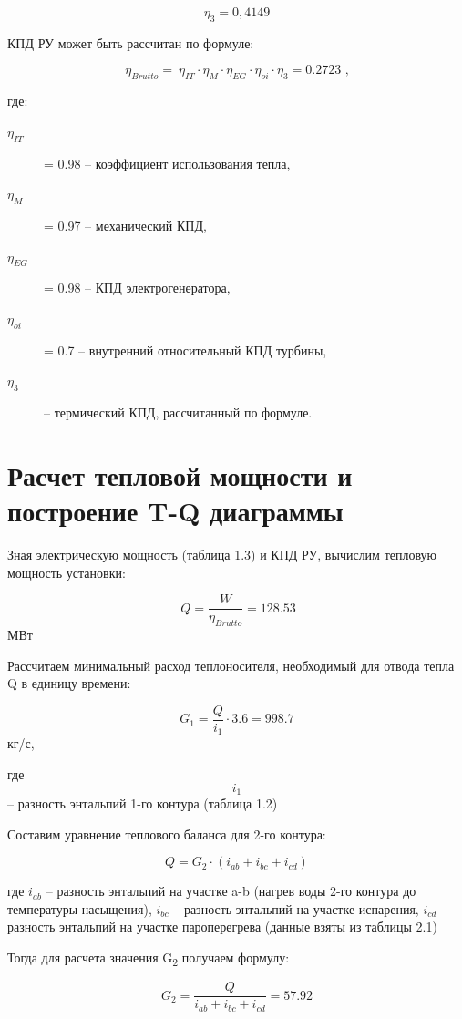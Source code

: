 \[\eta_{3} = 0,4149\]

КПД РУ может быть рассчитан по формуле:

\[\eta_{Brutto} = \ \eta_{IT} \cdot \eta_{M} \cdot \eta_{EG} \cdot \eta_{oi} \cdot \eta_{3} = 0.2723\textrm{ ,} \]

где: 
\begin{description}
	\item[$\eta_{IT}$] = 0.98 -- коэффициент использования тепла,
	\item[$\eta_{M}$] = 0.97 -- механический КПД,
	\item[$\eta_{EG}$] = 0.98 -- КПД электрогенератора,
	\item[$\eta_{oi}$] = 0.7 -- внутренний относительный КПД турбины,
	\item[$\eta_{3}$] -- термический КПД, рассчитанный по формуле.
\end{description}

\section{Расчет тепловой мощности и построение T-Q диаграммы}

Зная электрическую мощность (таблица 1.3) и КПД РУ, вычислим тепловую
мощность установки:

\[\ Q =\frac{W}{\eta_{Brutto}} = 128.53\] МВт

Рассчитаем минимальный расход теплоносителя, необходимый для отвода
тепла Q в единицу времени:



\[G_1 = \frac{Q}{{i}_{1}} \cdot 3.6 = 998.7\]кг/с,

где \[{i}_{1}\] -- разность энтальпий 1-го контура (таблица 1.2)

Составим уравнение теплового баланса для 2-го контура:

\begin{equation}
Q = G_2\cdot(i_{ab} + i_{bc} + i_{cd})
\end{equation}

где ${i}_{ab}$ -- разность энтальпий на участке a-b (нагрев
воды 2-го контура до температуры насыщения), ${i}_{bc}$ --
разность энтальпий на участке испарения, ${i}_{cd}$ -- разность
энтальпий на участке пароперегрева (данные взяты из таблицы 2.1)

Тогда для расчета значения G­\textsubscript{2} получаем формулу:

\begin{equation}
G_2 =\frac{Q}{{i}_{ab} + {i}_{bc} + {i}_{cd}} = 57.92
\end{equation}


